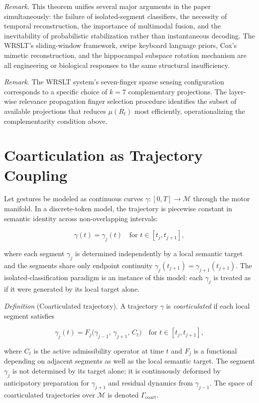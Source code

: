 \documentclass[11pt, a4paper]{article}
\theoremstyle{definition}
\begin{document}
\textit{Remark}. This theorem unifies several major arguments in the paper simultaneously: the failure of isolated-segment classifiers, the necessity of temporal reconstruction, the importance of multimodal fusion, and the inevitability of probabilistic stabilization rather than instantaneous decoding. The WRSLT's sliding-window framework, swipe keyboard language priors, Cox's mimetic reconstruction, and the hippocampal subspace rotation mechanism are all engineering or biological responses to the same structural insufficiency.

\textit{Remark}. The WRSLT system's seven-finger sparse sensing configuration corresponds to a specific choice of $k = 7$ complementary projections. The layer-wise relevance propagation finger selection procedure identifies the subset of available projections that reduces $\mu(R_t)$ most efficiently, operationalizing the complementarity condition above.

\section{Coarticulation as Trajectory Coupling}
\label{app:coarticulation}

Let gestures be modeled as continuous curves $\gamma : [0, T] \to \mathcal{M}$ through the motor manifold. In a discrete-token model, the trajectory is piecewise constant in semantic identity across non-overlapping intervals:

\[
\gamma(t) = \gamma_j(t) \quad \text{for } t \in [t_j, t_{j+1}],
\]

where each segment $\gamma_j$ is determined independently by a local semantic target and the segments share only endpoint continuity $\gamma_j(t_{j+1}) = \gamma_{j+1}(t_{j+1})$. The isolated-classification paradigm is an instance of this model: each $\gamma_j$ is treated as if it were generated by its local target alone.

\textit{Definition} (Coarticulated trajectory). A trajectory $\gamma$ is \emph{coarticulated} if each local segment satisfies

\[
\gamma_j(t) = F_j\bigl(\gamma_{j-1},\, \gamma_{j+1},\, C_t\bigr) \quad \text{for } t \in [t_j, t_{j+1}],
\]

where $C_t$ is the active admissibility operator at time $t$ and $F_j$ is a functional depending on adjacent segments as well as the local semantic target. The segment $\gamma_j$ is not determined by its target alone; it is continuously deformed by anticipatory preparation for $\gamma_{j+1}$ and residual dynamics from $\gamma_{j-1}$. The space of coarticulated trajectories over $\mathcal{M}$ is denoted $\Gamma_{\mathrm{coart}}$.
\end{document}
